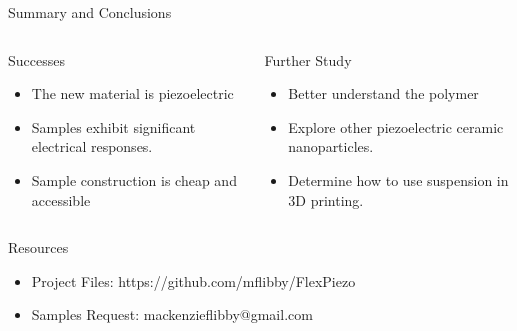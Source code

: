 \documentclass[hyperref=pdftex, presentation]{beamer}
\begin{document}



\begin{frame}{Summary and Conclusions}

  \begin{columns}[c] %

			\begin{block}{Successes}
				\begin{itemize}
 					\item<2-> The new material is piezoelectric %
					\item<3-> Samples exhibit significant electrical responses.
					\item<4-> Sample construction is cheap and accessible
				\end{itemize}
			\end{block}
			\begin{block}{Further Study}
				\begin{itemize}
 					\item<5-> Better understand the polymer %
					\item<6-> Explore other piezoelectric ceramic nanoparticles.
					\item<7-> Determine how to use suspension in 3D printing.
				\end{itemize}
			\end{block}

		\end{columns}
\end{frame}


\begin{frame}{Resources}
	\begin{itemize}
		\item Project Files: https://github.com/mflibby/FlexPiezo
		\item Samples Request: mackenzieflibby@gmail.com
	\end{itemize}
\end{frame}
\end{document}
